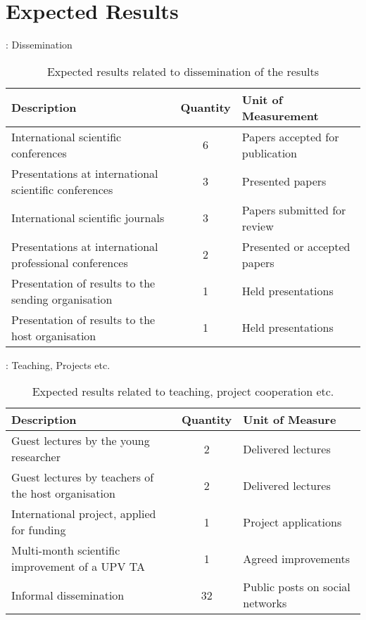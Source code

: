 \section{Expected Results}

\begin{frame}{\insertsection: Dissemination}
    \onslide<+->

    \scriptsize
    \begin{table}[h!]
    \renewcommand{\arraystretch}{1.5} %
    \centering
    \begin{tabular}{p{7cm}cp{4cm}}
    \textbf{Description} & \textbf{Quantity} & \textbf{Unit of Measurement} \\ \toprule
    International scientific conferences & 6 & Papers accepted for publication \\ \midrule
    Presentations at international scientific conferences & 3 & Presented papers \\ \midrule
    International scientific journals & 3 & Papers submitted for review \\ \midrule
    Presentations at international professional conferences & 2 & Presented or accepted papers \\ \midrule
    Presentation of results to the sending organisation & 1 & Held presentations \\ \midrule
    Presentation of results to the host organisation & 1 & Held presentations \\ \bottomrule
    \end{tabular}
    \caption{Expected results related to dissemination of the results}
    \label{tbl:results-dissemination}
    \end{table}
    

\end{frame}

\begin{frame}{\insertsection: Teaching, Projects etc.}
    \onslide<+->

    \scriptsize
    \begin{table}[h!]
    \renewcommand{\arraystretch}{1.5} %
    \centering
    \begin{tabular}{p{7cm}cp{4cm}}
    \textbf{Description} & \textbf{Quantity} & \textbf{Unit of Measure} \\\toprule
    Guest lectures by the young researcher & 2 & Delivered lectures \\\midrule
    Guest lectures by teachers of the host organisation & 2 & Delivered lectures \\\midrule
    International project, applied for funding & 1 & Project applications \\\midrule
    Multi-month scientific improvement of a \acs{UPV} TA & 1 & Agreed improvements \\\midrule
    Informal dissemination & 32 & Public posts on social networks \\\bottomrule
    \end{tabular}
    \caption{Expected results related to teaching, project cooperation etc.}
    \label{tbl:results-teaching-projects}
    \end{table}
    
\end{frame}